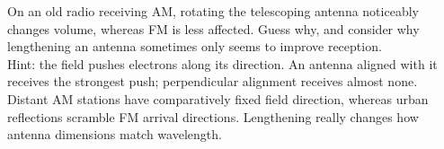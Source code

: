 \begin{puzzles}
\item On an old radio receiving AM, rotating the telescoping antenna noticeably changes volume, whereas FM is less affected. Guess why, and consider why lengthening an antenna sometimes only seems to improve reception.\\
Hint: the field pushes electrons along its direction. An antenna aligned with it receives the strongest push; perpendicular alignment receives almost none. Distant AM stations have comparatively fixed field direction, whereas urban reflections scramble FM arrival directions. Lengthening really changes how antenna dimensions match wavelength.
\end{puzzles}
